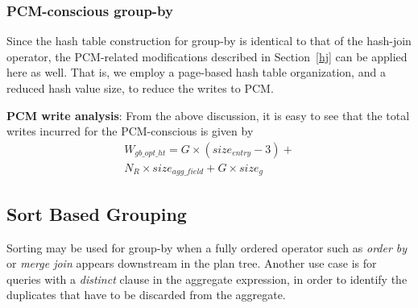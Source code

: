 
\subsubsection{PCM-conscious group-by}
Since the hash table construction for group-by is identical to that
of the hash-join operator, the PCM-related modifications described
in Section~\ref{hj} can be applied here as well. That is, we employ
a page-based hash table organization, and a reduced hash value size,
to reduce the writes to PCM.

\textbf{PCM write analysis}: From the above discussion, it is easy to see
that the total writes incurred for the PCM-conscious is given by
\begin{equation}
\begin{split}
W_{gb\_opt\_ht} = G \times (size_{entry} - 3) + \\
N_R \times size_{agg\_field} + G \times size_g
\end{split}
\end{equation}

\subsection{Sort Based Grouping}

Sorting may be used for group-by when a fully ordered operator such
as \textit{order by} or \textit{merge join} appears downstream in the plan
tree. Another use case is for queries with a \textit{distinct} clause
in the aggregate expression, in order to identify the duplicates that have
to be discarded from the aggregate.  

\begin{comment}
A sample case in point is the following SQL query: \\
\begin{small}
\hspace*{0.5in}	{\sf select o.customer, count(distinct(o.orderID))} \\
\hspace*{0.5in}	{\sf from orders as o}  \\
\hspace*{0.5in}	{\sf group by o.customer}
\end{small}
\end{comment}


\begin{comment}
Sorting thus is a commonly used technique for grouping but it incurs
its corresponding large number of writes.
In such a case, we can now no longer simply update the aggregate values in the hash table for group-by since the existence of duplicates needs to be checked in parallel. To get past this limitation, query optimisers usually choose to use sorting for aggregation. Since the group of tuples forming each aggregate now reside contiguously in the sorted list, duplicates can be identified easily and eliminated, while performing the aggregation.
\end{comment}



